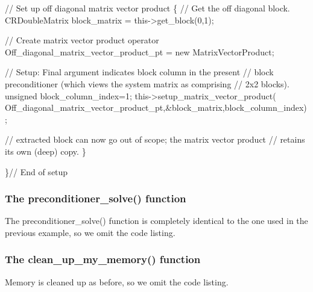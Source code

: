 \begin{DoxyCodeInclude}
   
   
  \textcolor{comment}{// Set up off diagonal matrix vector product}
  \{
   \textcolor{comment}{// Get the off diagonal block.}
   CRDoubleMatrix block\_matrix = this->get\_block(0,1);
   
   \textcolor{comment}{// Create matrix vector product operator}
   Off\_diagonal\_matrix\_vector\_product\_pt = \textcolor{keyword}{new} MatrixVectorProduct;
   
   \textcolor{comment}{// Setup: Final argument indicates block column in the present}
   \textcolor{comment}{// block preconditioner (which views the system matrix as comprising}
   \textcolor{comment}{// 2x2 blocks).}
   \textcolor{keywordtype}{unsigned} block\_column\_index=1;
   this->setup\_matrix\_vector\_product(
    Off\_diagonal\_matrix\_vector\_product\_pt,&block\_matrix,block\_column\_index);

   \textcolor{comment}{// extracted block can now go out of scope; the matrix vector product}
   \textcolor{comment}{// retains its own (deep) copy.}
  \}
 
 \}\textcolor{comment}{// End of setup}

\end{DoxyCodeInclude}
\hypertarget{index_coarse_two_plus_two_plus_one__solve}{}\subsubsection{The preconditioner\+\_\+solve() function}\label{index_coarse_two_plus_two_plus_one__solve}
The {\ttfamily preconditioner\+\_\+solve()} function is completely identical to the one used in the previous example, so we omit the code listing.\hypertarget{index_coarse_two_plus_two_plus_one_clean}{}\subsubsection{The clean\+\_\+up\+\_\+my\+\_\+memory() function}\label{index_coarse_two_plus_two_plus_one_clean}
Memory is cleaned up as before, so we omit the code listing.



 

